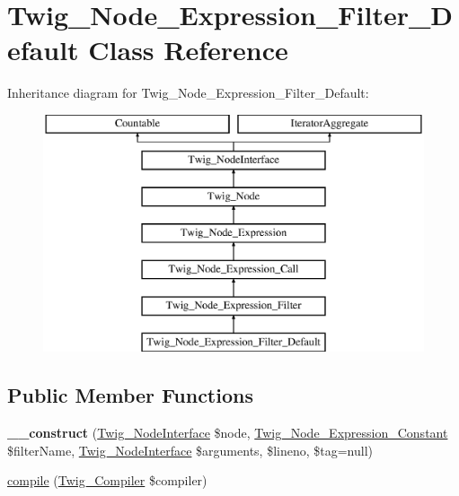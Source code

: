 \hypertarget{classTwig__Node__Expression__Filter__Default}{}\section{Twig\+\_\+\+Node\+\_\+\+Expression\+\_\+\+Filter\+\_\+\+Default Class Reference}
\label{classTwig__Node__Expression__Filter__Default}
Inheritance diagram for Twig\+\_\+\+Node\+\_\+\+Expression\+\_\+\+Filter\+\_\+\+Default\+:\begin{figure}[H]
\begin{center}
\leavevmode
\includegraphics[height=7.000000cm]{classTwig__Node__Expression__Filter__Default}
\end{center}
\end{figure}
\subsection*{Public Member Functions}
\begin{DoxyCompactItemize}
\item 
{\bfseries \+\_\+\+\_\+construct} (\hyperlink{interfaceTwig__NodeInterface}{Twig\+\_\+\+Node\+Interface} \$node, \hyperlink{classTwig__Node__Expression__Constant}{Twig\+\_\+\+Node\+\_\+\+Expression\+\_\+\+Constant} \$filter\+Name, \hyperlink{interfaceTwig__NodeInterface}{Twig\+\_\+\+Node\+Interface} \$arguments, \$lineno, \$tag=null)\hypertarget{classTwig__Node__Expression__Filter__Default_a2ab13c35816762ed8338696664a1b2c1}{}\label{classTwig__Node__Expression__Filter__Default_a2ab13c35816762ed8338696664a1b2c1}

\item 
\hyperlink{classTwig__Node__Expression__Filter__Default_a3acdce57e7eef8762df3720ae6e76bca}{compile} (\hyperlink{classTwig__Compiler}{Twig\+\_\+\+Compiler} \$compiler)
\end{DoxyCompactItemize}
